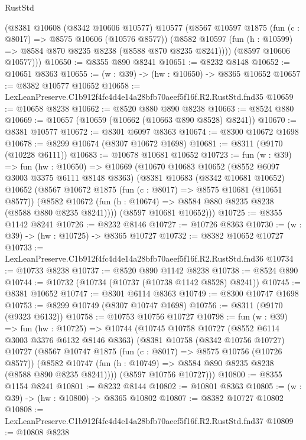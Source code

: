 \begin{lexlean}{RustStd}
\begin{coremodule}
      (@8381
        @10608
        (@8342 @10606 @10577)
        @10577
        (@8567
          @10597
          @1875
          (fun (c : @8017) => @8575 @10606 (@10576 @8577))
          (@8582 @10597 (fun (h : @10599) => @8584 @870 @8235 @8238 (@8588 @870 @8235 @8241))))
        (@8597 @10606 @10577)))
@10650 := @8355 @890 @8241
@10651 := @8232 @8148
@10652 := @10651 @8363
@10655 := (w : @39) -> (hw : @10650) -> @8365 @10652
@10657 := @8382 @10577 @10652
@10658 := LexLeanPreserve.C1b912f4fc4d4e14a28bfb70aeef5f16f.R2.RustStd.fnd35
@10659 := @10658 @8238
@10662 := @8520 @880 @890 @8238
@10663 := @8524 @880
@10669 := @10657 (@10659 (@10662 (@10663 @890 @8528) @8241))
@10670 := @8381 @10577
@10672 := @8301 @6097 @8363
@10674 := @8300 @10672 @1698
@10678 := @8299 @10674 (@8307 @10672 @1698)
@10681 := @8311 (@9170 (@10228 @6111))
@10683 := @10678 @10681 @10652
@10723 := fun (w : @39) =>
  fun (hw : @10650) =>
  @10669
    (@10670
      @10683
      @10652
      (@8552 @6097 @3003 @3375 @6111 @8148 @8363)
      (@8381
        @10683
        (@8342 @10681 @10652)
        @10652
        (@8567
          @10672
          @1875
          (fun (c : @8017) => @8575 @10681 (@10651 @8577))
          (@8582 @10672 (fun (h : @10674) => @8584 @880 @8235 @8238 (@8588 @880 @8235 @8241))))
        (@8597 @10681 @10652)))
@10725 := @8355 @1142 @8241
@10726 := @8232 @8146
@10727 := @10726 @8363
@10730 := (w : @39) -> (hw : @10725) -> @8365 @10727
@10732 := @8382 @10652 @10727
@10733 := LexLeanPreserve.C1b912f4fc4d4e14a28bfb70aeef5f16f.R2.RustStd.fnd36
@10734 := @10733 @8238
@10737 := @8520 @890 @1142 @8238
@10738 := @8524 @890
@10744 := @10732 (@10734 (@10737 (@10738 @1142 @8528) @8241))
@10745 := @8381 @10652
@10747 := @8301 @6114 @8363
@10749 := @8300 @10747 @1698
@10753 := @8299 @10749 (@8307 @10747 @1698)
@10756 := @8311 (@9170 (@9323 @6132))
@10758 := @10753 @10756 @10727
@10798 := fun (w : @39) =>
  fun (hw : @10725) =>
  @10744
    (@10745
      @10758
      @10727
      (@8552 @6114 @3003 @3376 @6132 @8146 @8363)
      (@8381
        @10758
        (@8342 @10756 @10727)
        @10727
        (@8567
          @10747
          @1875
          (fun (c : @8017) => @8575 @10756 (@10726 @8577))
          (@8582 @10747 (fun (h : @10749) => @8584 @890 @8235 @8238 (@8588 @890 @8235 @8241))))
        (@8597 @10756 @10727)))
@10800 := @8355 @1154 @8241
@10801 := @8232 @8144
@10802 := @10801 @8363
@10805 := (w : @39) -> (hw : @10800) -> @8365 @10802
@10807 := @8382 @10727 @10802
@10808 := LexLeanPreserve.C1b912f4fc4d4e14a28bfb70aeef5f16f.R2.RustStd.fnd37
@10809 := @10808 @8238

\end{coremodule}
\end{lexlean}
